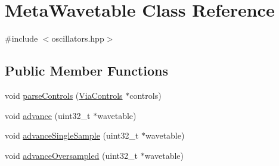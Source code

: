 \hypertarget{class_meta_wavetable}{}\section{Meta\+Wavetable Class Reference}
\label{class_meta_wavetable}


{\ttfamily \#include $<$oscillators.\+hpp$>$}

\subsection*{Public Member Functions}
\begin{DoxyCompactItemize}
\item 
void \mbox{\hyperlink{class_meta_wavetable_aef9e49472a0090846830c119098e5351}{parse\+Controls}} (\mbox{\hyperlink{class_via_controls}{Via\+Controls}} $\ast$controls)
\item 
void \mbox{\hyperlink{class_meta_wavetable_a7026d610900dc8549277f37fd8f56d80}{advance}} (uint32\+\_\+t $\ast$wavetable)
\item 
void \mbox{\hyperlink{class_meta_wavetable_a63b97b4f3c1dcfbefe9cd64e4f4ebdd9}{advance\+Single\+Sample}} (uint32\+\_\+t $\ast$wavetable)
\item 
void \mbox{\hyperlink{class_meta_wavetable_a7fcebc48f6a36942178e2cc787c9fd62}{advance\+Oversampled}} (uint32\+\_\+t $\ast$wavetable)
\end{DoxyCompactItemize}
